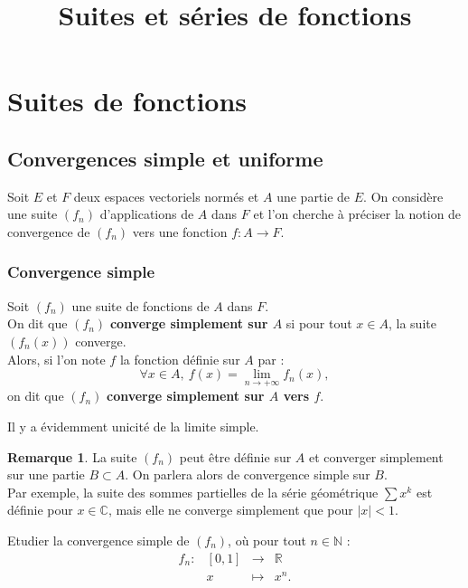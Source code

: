 \documentclass[french]{article}
\title{Suites et séries de fonctions}
\date{}
\newcommand{\N}{\mathbb{N}}
\newcommand{\R}{\mathbb{R}}
\newcommand{\C}{\mathbb{C}}
\theoremstyle{plain}
\theoremstyle{definition}
\newtheorem*{rmq}{Remarque}
\theoremstyle{remark}
\begin{document}
\tableofcontents

\newpage
\maketitle

\section{Suites de fonctions}

\subsection{Convergences simple et uniforme}

Soit $E$ et $F$ deux espaces vectoriels normés et $A$ une partie de $E$. On considère une suite $(f_n)$ d'applications de $A$ dans $F$ et l'on cherche à préciser la notion de convergence de $(f_n)$ vers une fonction $f:A\to F$.

\subsubsection*{Convergence simple}

\begin{dfn}
	Soit $(f_n)$ une suite de fonctions de $A$ dans $F$.\\
	On dit que $(f_n)$ \textbf{converge simplement sur $A$} si pour tout $x\in A$, la suite $(f_n(x))$ converge.\\
	Alors, si l'on note $f$ la fonction définie sur $A$ par :
	$$\forall x\in A,\ f(x)=\underset{n\to+\infty}{\lim}f_n(x),$$ on dit que $(f_n)$ \textbf{converge simplement sur $A$ vers $f$}.
\end{dfn}

Il y a évidemment unicité de la limite simple.

\begin{rmq}
	La suite $(f_n)$ peut être définie sur $A$ et converger simplement sur une partie $B\subset A$. On parlera alors de convergence simple sur $B$.\\
	Par exemple, la suite des sommes partielles de la série géométrique $\displaystyle\sum x^k$ est définie pour $x\in\C$, mais elle ne converge simplement que pour $\lvert x\rvert<1$.
\end{rmq}

\begin{exo}
	Etudier la convergence simple de $(f_n)$, où pour tout $n\in\N$ :
	$$\begin{array}{lrcl}
		f_n:&[0,1]&\longrightarrow&\R\\
		&x&\longmapsto&x^n.
	\end{array}$$
\end{exo}%
\end{document}
